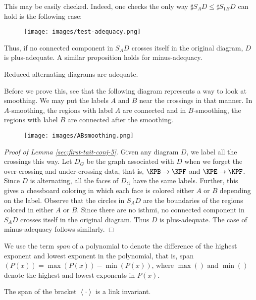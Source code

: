 This may be easily checked. Indeed, one checks the only way $\sharp S_AD \leq \sharp S_{1B}D$ can hold is the following case:
\begin{figure}[h]
  \centering
  \texttt{[image: images/test-adequacy.png]}
\end{figure}

Thus, if no connected component in $S_AD$ crosses itself in the original diagram, $D$ is plus-adequate. A similar proposition holds for minus-adequacy.

\begin{lemma}
\label{sec:first-tait-conj-5}
Reduced alternating diagrams are adequate.
\end{lemma}

Before we prove this, see that the following diagram represents a way to look at smoothing. We may put the labels $A$ and $B$ near the crossings in that manner. In $A$-smoothing, the regions with label $A$ are connected and in $B$-smoothing, the regions with label $B$ are connected after the smoothing.

\begin{figure}[h]
  \centering
  \texttt{[image: images/ABsmoothing.png]}
\end{figure}

\begin{proof}[Proof of Lemma \ref{sec:first-tait-conj-5}]
\label{sec:first-tait-conj-6}
Given any diagram $D$, we label all the crossings this way. Let $D_G$ be the graph associated with $D$ when we forget the over-crossing and under-crossing data, that is, $\KPB \to \KPF$ and $\KPE \to \KPF$. Since $D$ is alternating, all the faces of $D_G$ have the same labels. Further, this gives a chessboard coloring in which each face is colored either $A$ or $B$ depending on the label. Observe that the circles in $S_AD$ are the boundaries of the regions colored in either $A$ or $B$. Since there are no isthmi, no connected component in $S_AD$ crosses itself in the original diagram. Thus $D$ is plus-adequate. The case of minus-adequacy follows similarly.
\end{proof}

We use the term \emph{span} of a polynomial to denote the difference of the highest exponent and lowest exponent in the polynomial, that is, span$(P(x)) = \max(P(x)) - \min(P(x))$, where $\max()$ and $\min()$ denote the highest and lowest exponents in $P(x)$. 

\begin{proposition}
\label{sec:first-tait-conj-9}
The span of the bracket $\left< \cdot \right>$ is a link invariant.
\end{proposition}


